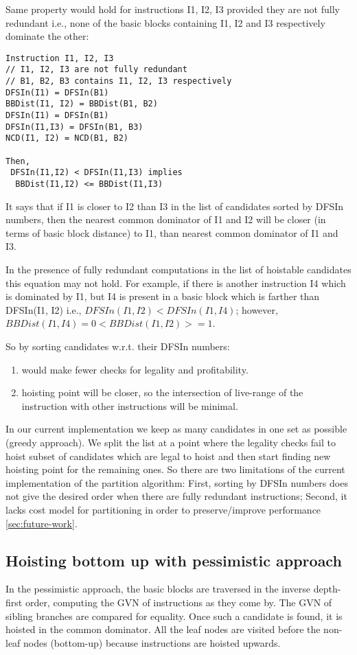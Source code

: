 \documentclass{sig-alternate}
\begin{document}
Same property would hold for instructions I1, I2, I3 provided they are not fully
redundant i.e., none of the basic blocks containing I1, I2 and I3 respectively
dominate the other:

\begin{verbatim}
Instruction I1, I2, I3
// I1, I2, I3 are not fully redundant
// B1, B2, B3 contains I1, I2, I3 respectively
DFSIn(I1) = DFSIn(B1)
BBDist(I1, I2) = BBDist(B1, B2)
DFSIn(I1) = DFSIn(B1)
DFSIn(I1,I3) = DFSIn(B1, B3)
NCD(I1, I2) = NCD(B1, B2)

Then,
 DFSIn(I1,I2) < DFSIn(I1,I3) implies
  BBDist(I1,I2) <= BBDist(I1,I3)
\end{verbatim}

It says that if I1 is closer to I2 than I3 in the list of candidates sorted by
DFSIn numbers, then the nearest common dominator of I1 and I2 will be closer (in
terms of basic block distance) to I1, than nearest common dominator of I1 and
I3.

In the presence of fully redundant computations in the list of hoistable
candidates this equation may not hold. For example, if there is another
instruction I4 which is dominated by I1, but I4 is present in a basic block
which is farther than DFSIn(I1, I2) i.e., $DFSIn(I1,I2) < DFSIn(I1,I4)$;
however, $BBDist(I1,I4) = 0 < BBDist(I1,I2) >=1$.

So by sorting candidates w.r.t. their DFSIn numbers:
\begin{enumerate}
\item would make fewer checks for legality and profitability.
\item hoisting point will be closer, so the intersection of live-range of the
  instruction with other instructions will be minimal.
\end{enumerate}

In our current implementation we keep as many candidates in one set as possible
(greedy approach). We split the list at a point where the legality checks fail
to hoist subset of candidates which are legal to hoist and then start finding
new hoisting point for the remaining ones. So there are two limitations of the
current implementation of the partition algorithm: First, sorting by DFSIn
numbers does not give the desired order when there are fully redundant
instructions; Second, it lacks cost model for partitioning in order to
preserve/improve performance \ref{sec:future-work}.

\subsection{Hoisting bottom up with pessimistic approach}
\label{subsec:pessimistic}
In the pessimistic approach, the basic blocks are traversed in the inverse
depth-first order, computing the GVN of instructions as they come by. The GVN of
sibling branches are compared for equality. Once such a candidate is found, it
is hoisted in the common dominator. All the leaf nodes are visited before the
non-leaf nodes (bottom-up) because instructions are hoisted upwards.
\end{document}
